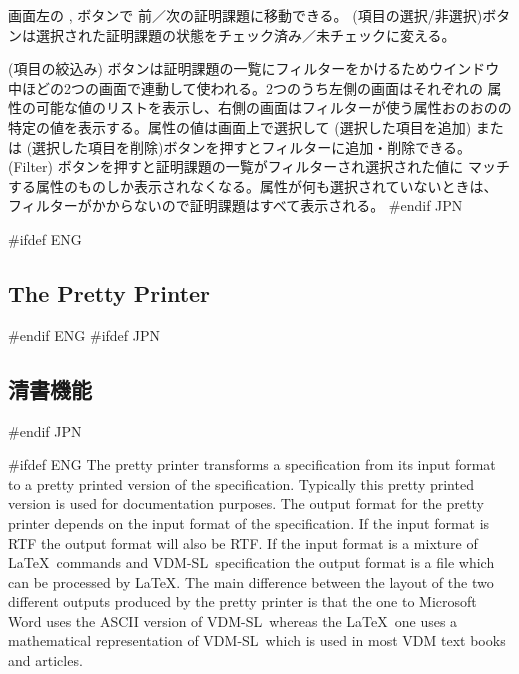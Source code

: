 \documentclass[\pformat,12pt]{article}
\newcommand{\vdmslpp}{VDM-SL}
\newcommand{\vdmslpp}{VDM++}
\newcommand{\guicmd}[1]{{\sf #1}}
\newcommand{\guicmd}[1]{{\gt #1}}
\begin{document}
画面左の
 ,
 ボタンで
前／次の証明課題に移動できる。 
(\guicmd{項目の選択/非選択})ボタンは選択された証明課題の状態をチェック済み／未チェックに変える。

(\guicmd{項目の絞込み}) ボタンは証明課題の一覧にフィルターをかけるためウインドウ
中ほどの2つの画面で連動して使われる。2つのうち左側の画面はそれぞれの
属性の可能な値のリストを表示し、右側の画面はフィルターが使う属性おのおのの
特定の値を表示する。属性の値は画面上で選択して%
(\guicmd{選択した項目を追加}) または%
(\guicmd{選択した項目を削除})ボタンを押すとフィルターに追加・削除できる。 %
(\guicmd{Filter}) ボタンを押すと証明課題の一覧がフィルターされ選択された値に%
マッチする属性のものしか表示されなくなる。属性が何も選択されていないときは、%
フィルターがかからないので証明課題はすべて表示される。
#endif JPN

\newpage
#ifdef ENG
\subsection{The Pretty Printer}\label{sec:pp}
#endif ENG
#ifdef JPN
\subsection{清書機能}\label{sec:pp}
#endif JPN

#ifdef ENG
The pretty printer transforms a specification from its input format to
a pretty printed version of the specification. Typically this pretty
printed version is used for documentation purposes. The output format
for the pretty printer depends on the input format of the
specification. If the input format is RTF the output format will also
be RTF. If the input format is a mixture of \LaTeX\ commands and
\vdmslpp\ specification the output format is a file which can be processed
by \LaTeX. 
The main difference between the layout of the
two different outputs produced by the pretty printer is that the one
to Microsoft Word uses the ASCII version of \vdmslpp\ whereas the
\LaTeX\ one uses a mathematical representation of \vdmslpp\ which
is used in most VDM text books and articles.
\end{document}
